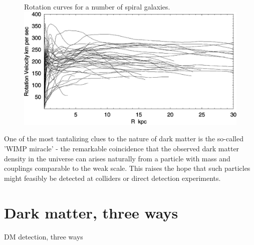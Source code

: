 \strictpagecheck
\begin{figure}
  \begin{sidecaption}
    {Rotation curves for a number of spiral galaxies. \citep{Sofue2001}}
  \includegraphics[width=\textwidth]{images/rotation_curves}
\end{sidecaption}
\end{figure}
One of the most tantalizing clues to the nature of dark matter is the so-called 'WIMP miracle' - the remarkable coincidence that the observed dark matter density in the universe can arises naturally from a particle with mass and couplings comparable to the weak scale. This raises the hope that such particles might feasibly be detected at colliders or direct detection experiments.
\section{Dark matter, three ways}\label{dark-matter-three-ways}
\begin{marginfigure}
  \centering
  \caption{DM detection, three ways}
  \label{fig:dm_annihilation}
\end{marginfigure}

